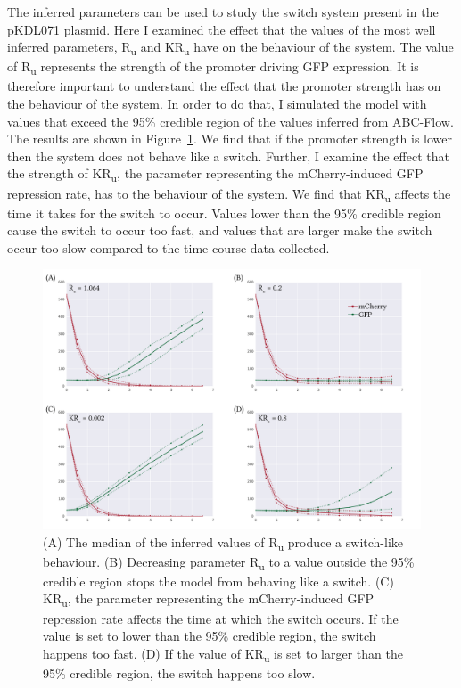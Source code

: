 The inferred parameters can be used to study the switch system present in the pKDL071 plasmid. Here I examined the effect that the values of the most well inferred parameters, R\textsubscript{u} and KR\textsubscript{u} have on the behaviour of the system. The value of R\textsubscript{u} represents the strength of the promoter driving GFP expression. It is therefore important to understand the effect that the promoter strength has on the behaviour of the system. In order to do that, I simulated the model with values that exceed the 95\% credible region of the values inferred from ABC-Flow. The results are shown in Figure~\ref{fig:prom_str}. We find that if the promoter strength is lower then the system does not behave like a switch. Further, I examine the effect that the strength of KR\textsubscript{u}, the parameter representing the mCherry-induced GFP repression rate, has to the behaviour of the system. We find that KR\textsubscript{u} affects the time it takes for the switch to occur. Values lower than the 95\% credible region cause the switch to occur too fast, and values that are larger make the switch occur too slow compared to the time course data collected.


\begin{figure}[htb]
\centerfloat
	\includegraphics[width=\textwidth]{../../chapters/chapterABCFlow/images/promoter_strengths.png}
	\caption[The inferred parameter values produce a switch]{\label{fig:prom_str} (A) The median of the inferred values of R\textsubscript{u} produce a switch-like behaviour. (B) Decreasing parameter R\textsubscript{u} to a value outside the 95\% credible region stops the model from behaving like a switch. (C) KR\textsubscript{u}, the parameter representing the mCherry-induced GFP repression rate affects the time at which the switch occurs. If the value is set to lower than the 95\% credible region, the switch happens too fast. (D) If the value of KR\textsubscript{u} is set to larger than the 95\% credible region, the switch happens too slow.}
\end{figure}




